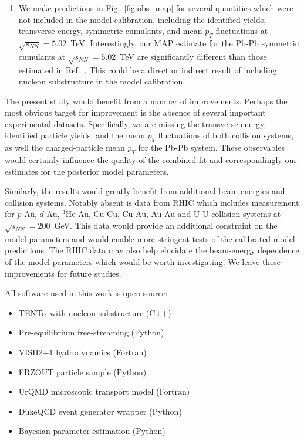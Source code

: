 \documentclass[aps,prc,reprint,amsmath,nofootinbib]{revtex4-1}
\newcommand{\trento}{T\raisebox{-0.5ex}{R}ENTo}
\newcommand{\sqrts}{\sqrt{s_{NN}}}
\begin{document}
\begin{enumerate}[itemsep=0pt, leftmargin=2\parindent]
  \item
    We make predictions in Fig.~\ref{fig:obs_map} for several quantities which were not included in the model calibration, including the identified yields, transverse energy, symmetric cumulants, and mean $p_T$ fluctuations at $\sqrts=5.02$~TeV.
    Interestingly, our MAP estimate for the Pb-Pb symmetric cumulants at $\sqrts=5.02$~TeV are significantly different than those estimated in Ref.~\cite{Bernhard:2018hnz}.
    This could be a direct or indirect result of including nucleon substructure in the model calibration.
\end{enumerate}

The present study would benefit from a number of improvements.
Perhaps the most obvious target for improvement is the absence of several important experimental datasets.
Specifically, we are missing the transverse energy, identified particle yields, and the mean $p_T$ fluctuations of both collision systems, as well the charged-particle mean $p_T$ for the Pb-Pb system.
These observables would certainly influence the quality of the combined fit and correspondingly our estimates for the posterior model parameters.

Similarly, the results would greatly benefit from additional beam energies and collision systems.
Notably absent is data from RHIC which includes measurement for $p$-Au, $d$-Au, $^3$He-Au, Cu-Cu, Cu-Au, Au-Au and U-U collision systems at $\sqrts=200$~GeV.
This data would provide an additional constraint on the model parameters and would enable more stringent tests of the calibrated model predictions.
The RHIC data may also help elucidate the beam-energy dependence of the model parameters which would be worth investigating.
We leave these improvements for future studies.

\medskip

All software used in this work is open source:
\begin{itemize}[leftmargin=2\parindent, itemsep=0pt, topsep=5pt]
  \item \trento\ with nucleon substructure (C++) \cite{trento:code}
  \item Pre-equilibrium free-streaming (Python) \cite{freestream:code}
  \item VISH2+1 hydrodynamics (Fortran) \cite{osuhydro:code}
  \item FRZOUT particle sample (Python) \cite{frzout:code}
  \item UrQMD microscopic transport model (Fortran) \cite{urqmd:code}
  \item DukeQCD event generator wrapper (Python) \cite{eventgen:code}
  \item Bayesian parameter estimation (Python) \cite{bayesian:code}
\end{itemize}
\end{document}
